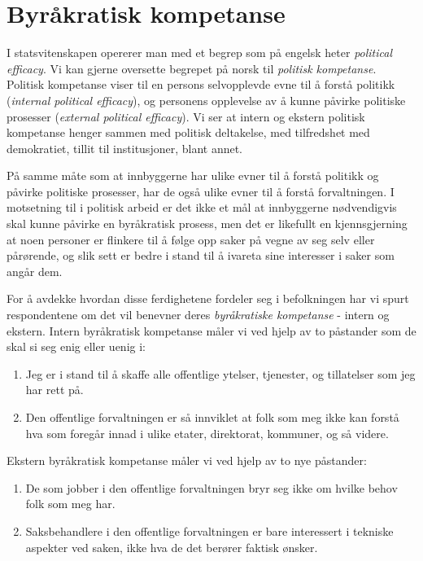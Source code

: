 \documentclass[
]{book}
\begin{document}
\hypertarget{byruxe5kratisk-kompetanse}{%
\section{Byråkratisk kompetanse}\label{byruxe5kratisk-kompetanse}}

I statsvitenskapen opererer man med et begrep som på engelsk heter \emph{political efficacy}.
Vi kan gjerne oversette begrepet på norsk til \emph{politisk kompetanse}.
Politisk kompetanse viser til en persons selvopplevde evne til å forstå politikk (\emph{internal political efficacy}), og personens opplevelse av å kunne påvirke politiske prosesser (\emph{external political efficacy}).
Vi ser at intern og ekstern politisk kompetanse henger sammen med politisk deltakelse, med tilfredshet med demokratiet, tillit til institusjoner, blant annet.

På samme måte som at innbyggerne har ulike evner til å forstå politikk og påvirke politiske prosesser, har de også ulike evner til å forstå forvaltningen.
I motsetning til i politisk arbeid er det ikke et mål at innbyggerne nødvendigvis skal kunne påvirke en byråkratisk prosess, men det er likefullt en kjennsgjerning at noen personer er flinkere til å følge opp saker på vegne av seg selv eller pårørende, og slik sett er bedre i stand til å ivareta sine interesser i saker som angår dem.

For å avdekke hvordan disse ferdighetene fordeler seg i befolkningen har vi spurt respondentene om det vil benevner deres \emph{byråkratiske kompetanse} - intern og ekstern.
Intern byråkratisk kompetanse måler vi ved hjelp av to påstander som de skal si seg enig eller uenig i:

\begin{enumerate}
\def\labelenumi{\arabic{enumi}.}
\item
  Jeg er i stand til å skaffe alle offentlige ytelser, tjenester, og tillatelser som jeg har rett på.
\item
  Den offentlige forvaltningen er så innviklet at folk som meg ikke kan forstå hva som foregår innad i ulike etater, direktorat, kommuner, og så videre.
\end{enumerate}

Ekstern byråkratisk kompetanse måler vi ved hjelp av to nye påstander:

\begin{enumerate}
\def\labelenumi{\arabic{enumi}.}
\item
  De som jobber i den offentlige forvaltningen bryr seg ikke om hvilke behov folk som meg har.
\item
  Saksbehandlere i den offentlige forvaltningen er bare interessert i tekniske aspekter ved saken, ikke hva de det berører faktisk ønsker.
\end{enumerate}
\end{document}
